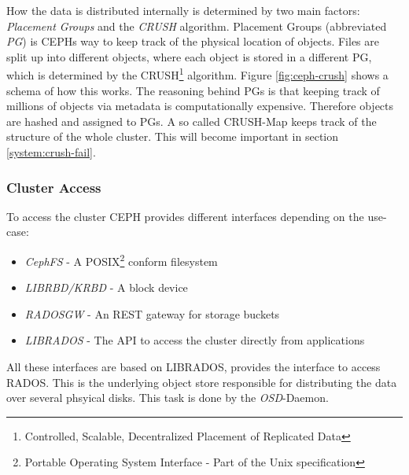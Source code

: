 \documentclass[titlepage, a4paper, 11pt]{scrartcl}
\begin{document}
            How the data is distributed internally is determined by two main factors: \textit{Placement Groups} and the \textit{CRUSH} algorithm.
            Placement Groups (abbreviated \textit{PG}) is CEPHs way to keep track of the physical location of objects.
            Files are split up into different objects, where each object is stored in a different PG, which is determined by the 
            CRUSH\footnote{Controlled, Scalable, Decentralized Placement of Replicated Data} algorithm\cite{weil2007ceph}. Figure \ref{fig:ceph-crush}
            shows a schema of how this works.
            The reasoning behind PGs is that keeping track of millions of objects via metadata is computationally expensive\cite{PGcephDocu}.
            Therefore objects are hashed and assigned to PGs.
            A so called CRUSH-Map keeps track of the structure of the whole cluster. This will become important in section \ref{system:crush-fail}.

            \subsubsection{Cluster Access}

                To access the cluster CEPH provides different interfaces depending on the use-case:

                \begin{itemize}
                    \item \textit{CephFS} - A POSIX\footnote{Portable Operating System Interface - Part of the Unix specification} conform filesystem
                    \item \textit{LIBRBD/KRBD} - A block device
                    \item \textit{RADOSGW} - An REST gateway for storage buckets
                    \item \textit{LIBRADOS} - The API to access the cluster directly from applications
                \end{itemize}

                All these interfaces are based on LIBRADOS, provides the interface to access RADOS. This is the underlying object store
                responsible for distributing the data over several phsyical disks. This task is done by the \textit{OSD}-Daemon.
\end{document}
